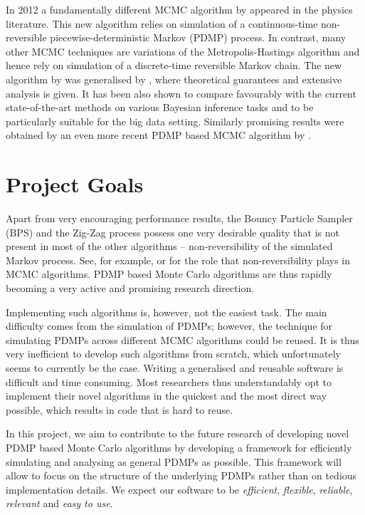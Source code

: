 \documentclass[report.tex]{subfiles}
\begin{document}
In 2012 a fundamentally different MCMC algorithm by \citet{peters2012rejection}
appeared in the physics literature. This new algorithm relies on simulation of
a continuous-time non-reversible piecewise-deterministic Markov (PDMP) process. In
contrast, many other MCMC techniques are variations of the
Metropolis-Hastings algorithm and hence rely on simulation of a discrete-time
reversible Markov chain.
The new algorithm by \citet{peters2012rejection}
was generalised by \citet{bouchard2015bouncy},
where theoretical guarantees and extensive analysis is given.
It has been also shown to compare favourably with the current
state-of-the-art methods on various Bayesian inference tasks and to be
particularly suitable for the big data setting.
Similarly promising results were obtained by an even more recent PDMP based
MCMC algorithm by \citet{bierkens2016zig}.

\section{Project Goals}

Apart from very encouraging performance results, the Bouncy Particle Sampler (BPS)
\cite{peters2012rejection, bouchard2015bouncy}
and the Zig-Zag process \cite{bierkens2016zig}
possess one very desirable quality that is not present in most of the other algorithms --
non-reversibility of the simulated Markov process.
See, for example, \citet{neal2004improving} or \citet{sun2010improving} for the role
that non-reversibility plays in MCMC algorithms.
PDMP based Monte Carlo algorithms are thus rapidly becoming a very active and promising
research direction.

Implementing such algorithms is, however, not the easiest task.
The main difficulty comes from the simulation of
PDMPs; however, the technique for simulating PDMPs across different MCMC algorithms
could be reused.
It is thus very inefficient to develop such algorithms from
scratch, which unfortunately seems to currently be the case.
Writing a generalised and
reusable software is difficult and time consuming.
Most researchers thus understandably opt to implement their novel algorithms in
the quickest and the most direct way possible, which results in code that is
hard to reuse.

In this project, we aim to contribute to the future research of developing
novel PDMP based Monte Carlo algorithms by developing a framework for efficiently
simulating and analysing as general PDMPs as possible.
This framework will allow to focus on the structure of the underlying PDMPs rather
than on tedious implementation details.
We expect our software to be \textit{efficient}, \textit{flexible},
\textit{reliable}, \textit{relevant} and \textit{easy to use}.
\end{document}
